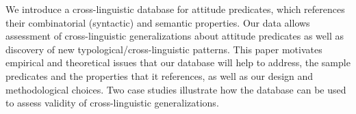 We introduce a cross-linguistic database for attitude predicates, which references their combinatorial (syntactic) and semantic properties. Our data allows assessment of cross-linguistic generalizations about attitude predicates as well as discovery of new typological/cross-linguistic patterns. This paper motivates empirical and theoretical issues that our database will help to address, the sample predicates and the properties that it references, as well as our design and methodological choices. Two case studies illustrate how the database can be used to assess validity of cross-linguistic generalizations.
\endinput